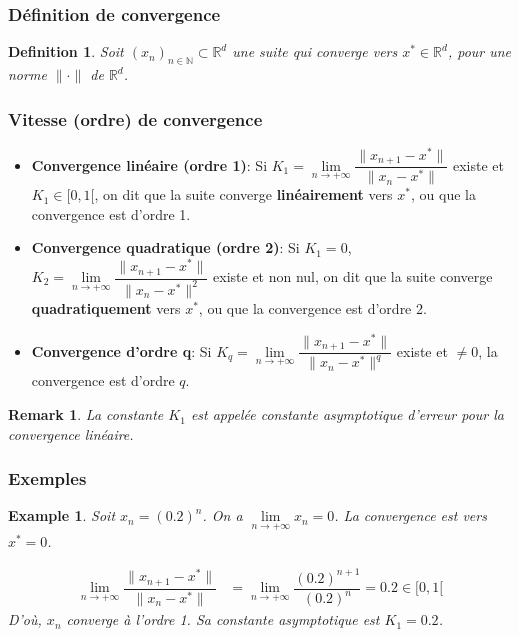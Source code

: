 \documentclass{article}
\newtheorem{definition}{Definition}
\newtheorem{remark}{Remark}
\newtheorem{example}{Example}
\begin{document}
\subsubsection{Définition de convergence}
\begin{definition}
Soit $(x_n)_{n \in \mathbb{N}} \subset \mathbb{R}^d$ une suite qui converge vers $x^* \in \mathbb{R}^d$, pour une norme $\|\cdot\|$ de $\mathbb{R}^d$.
\end{definition}

\subsubsection{Vitesse (ordre) de convergence}

\begin{itemize}
    \item \textbf{Convergence linéaire (ordre 1)}: Si $K_1 = \lim\limits_{n \to +\infty} \dfrac{\|x_{n+1}-x^*\|}{\|x_n-x^*\|}$ existe et $K_1 \in [0, 1[$, on dit que la suite converge \textbf{linéairement} vers $x^*$, ou que la convergence est d'ordre 1.
\end{itemize}

\begin{itemize}
    \item \textbf{Convergence quadratique (ordre 2)}: Si $K_1 = 0$, $K_2 = \lim\limits_{n \to +\infty} \dfrac{\|x_{n+1}-x^*\|}{\|x_n-x^*\|^2}$ existe et non nul, on dit que la suite converge \textbf{quadratiquement} vers $x^*$, ou que la convergence est d'ordre 2.
\end{itemize}

\begin{itemize}
    \item \textbf{Convergence d'ordre q}: Si $K_q = \lim\limits_{n \to +\infty} \dfrac{\|x_{n+1}-x^*\|}{\|x_n-x^*\|^q}$ existe et $\neq 0$, la convergence est d'ordre $q$.
\end{itemize}

\begin{remark}
La constante $K_1$ est appelée constante asymptotique d'erreur pour la convergence linéaire.
\end{remark}

\subsubsection{Exemples}

\begin{example}
Soit $x_n = (0.2)^n$.
On a $\lim\limits_{n \to +\infty} x_n = 0$. La convergence est vers $x^* = 0$.

\begin{align*}
\lim\limits_{n \to +\infty} \dfrac{\|x_{n+1}-x^*\|}{\|x_n-x^*\|} &= \lim\limits_{n \to +\infty} \dfrac{(0.2)^{n+1}}{(0.2)^n} = 0.2 \in [0, 1[
\end{align*}
D'où, $x_n$ converge à l'ordre 1.
Sa constante asymptotique est $K_1 = 0.2$.
\end{example}
\end{document}
